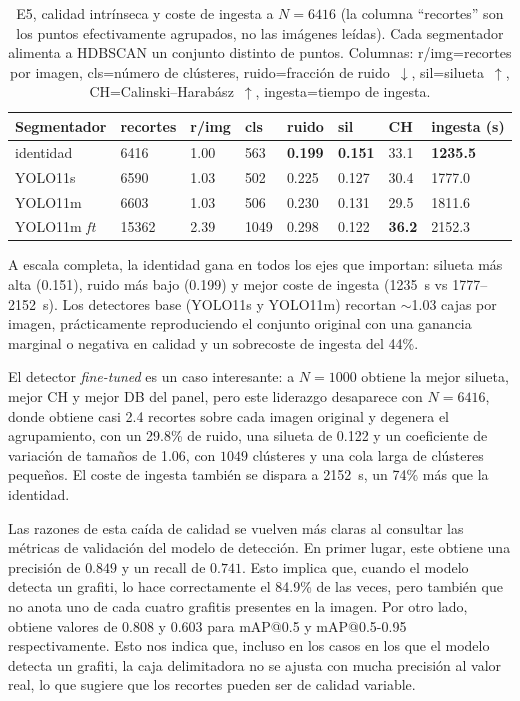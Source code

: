 \begin{table}[h]
\caption[E5, calidad y coste de ingesta a $N=6416$]{E5, calidad intrínseca y coste de ingesta a $N=6416$ (la columna
\enquote{recortes} son los puntos efectivamente agrupados, no las imágenes leídas).
Cada segmentador alimenta a HDBSCAN un conjunto distinto de puntos.
Columnas: r/img=recortes por imagen, cls=número de clústeres,
ruido=fracción de ruido~$\downarrow$, sil=silueta~$\uparrow$,
CH=Calinski--Harabász~$\uparrow$, ingesta=tiempo de ingesta.}
\label{tab:e5-segmenter-6416}
\centering
{\footnotesize
\begin{tabular}{|p{2.3cm}|p{1.2cm}|p{0.8cm}|p{0.8cm}|p{0.9cm}|p{0.8cm}|p{0.8cm}|p{1.2cm}|} \hline
  \textbf{Segmentador} & \textbf{recortes} & \textbf{r/img} & \textbf{cls} & \textbf{ruido} & \textbf{sil} & \textbf{CH} & \textbf{ingesta (s)} \\ \hline
  identidad           & 6416  & 1.00 &  563 & \textbf{0.199} & \textbf{0.151} & 33.1 & \textbf{1235.5} \\ \hline
  YOLO11s             & 6590  & 1.03 &  502 & 0.225 & 0.127 & 30.4 & 1777.0 \\ \hline
  YOLO11m             & 6603  & 1.03 &  506 & 0.230 & 0.131 & 29.5 & 1811.6 \\ \hline
  YOLO11m \textit{ft} & 15362 & 2.39 & 1049 & 0.298 & 0.122 & \textbf{36.2} & 2152.3 \\ \hline
\end{tabular}
}
\end{table}

A escala completa, la identidad gana en todos los ejes que importan: silueta
más alta (0.151), ruido más bajo (0.199) y mejor coste de ingesta (1235~s vs
1777--2152~s). Los detectores base (YOLO11s y YOLO11m) recortan $\sim$1.03
cajas por imagen, prácticamente reproduciendo el conjunto original con una
ganancia marginal o negativa en calidad y un sobrecoste de ingesta del 44\%.

El detector \textit{fine-tuned} es un caso interesante: a $N=1000$ obtiene la
mejor silueta, mejor CH y mejor DB del panel, pero este liderazgo desaparece
con $N=6416$, donde obtiene casi 2.4 recortes sobre cada imagen original y
degenera el agrupamiento, con un 29.8\% de ruido, una silueta de 0.122 y un
coeficiente de variación de tamaños de 1.06, con $1049$ clústeres y una cola
larga de clústeres pequeños. El coste de ingesta también se dispara a 2152~s,
un 74\% más que la identidad.

Las razones de esta caída de calidad se vuelven más claras al consultar las
métricas de validación del modelo de detección. En primer lugar, este
obtiene una precisión de $0.849$ y un recall de $0.741$. Esto implica que,
cuando el modelo detecta un grafiti, lo hace correctamente el 84.9\% de las
veces, pero también que no anota uno de cada cuatro grafitis presentes en la
imagen. Por otro lado, obtiene valores de $0.808$ y $0.603$ para mAP@0.5 y
mAP@0.5-0.95 respectivamente. Esto nos indica que, incluso en los casos en los
que el modelo detecta un grafiti, la caja delimitadora no se ajusta con mucha
precisión al valor real, lo que sugiere que los recortes pueden ser de calidad
variable.

